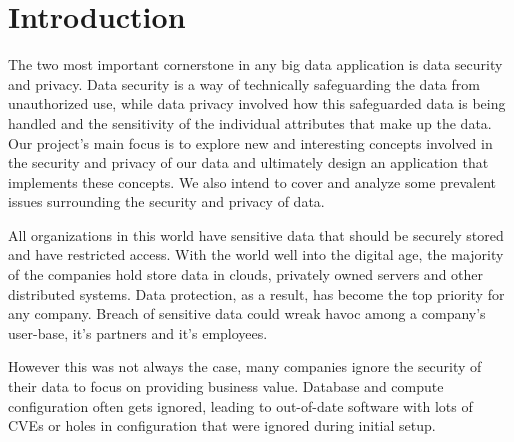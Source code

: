 \documentclass[sigconf]{acmart}
\begin{document}


\maketitle

\section{Introduction}

The two most important cornerstone in any big data application is data security and privacy. Data security is a way of technically safeguarding the data from unauthorized use, while data privacy involved how this safeguarded data is being handled and the sensitivity of the individual attributes that make up the data. Our project's main focus is to explore new and interesting concepts involved in the security and privacy of our data and ultimately design an application that implements these concepts. We also intend to cover and analyze some prevalent issues surrounding the security and privacy of data.

All organizations in this world have sensitive data that should be securely stored and have restricted access. With the world well into the digital age, the majority of the companies hold store data in clouds, privately owned servers and other distributed systems. Data protection, as a result, has become the top priority for any company. Breach of sensitive data could wreak havoc among a company's user-base, it's partners and it's employees. 

However this was not always the case, many companies ignore the security of their data to focus on providing business value. Database and compute configuration often gets ignored, leading to out-of-date software with lots of CVEs or holes in configuration that were ignored during initial setup.
\end{document}

